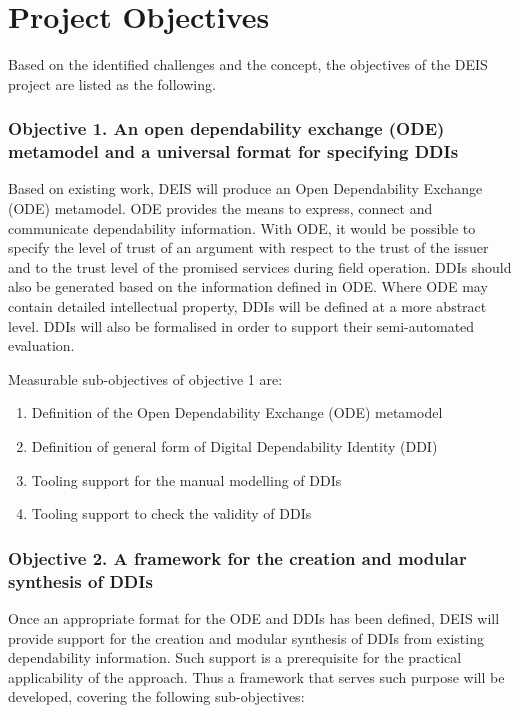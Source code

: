\section{Project Objectives}
Based on the identified challenges and the concept, the objectives of the DEIS project are listed as the following.

\subsubsection{Objective 1. An open dependability exchange (ODE) metamodel and a universal format for specifying DDIs} 
Based on existing work, DEIS will produce an Open Dependability Exchange (ODE) metamodel. ODE provides the means to express, connect and communicate dependability information.  
With ODE, it would be possible to specify the level of trust of an argument with respect to the trust of the issuer and to the trust level of the promised services during field operation. DDIs should also be generated based on the information defined in ODE. Where ODE may contain detailed intellectual property, DDIs will be defined at a more abstract level. DDIs will also be formalised in order to support their semi-automated evaluation.

Measurable sub-objectives of objective 1 are:
\begin{enumerate}
	\item Definition of the Open Dependability Exchange (ODE) metamodel
	\item Definition of general form of Digital Dependability Identity (DDI)
	\item Tooling support for the manual modelling of DDIs
	\item Tooling support to check the validity of DDIs
\end{enumerate}

\subsubsection{Objective 2. A framework for the creation and modular synthesis of DDIs}
Once an appropriate format for the ODE and DDIs has been defined, DEIS will provide support for the creation and modular synthesis of DDIs from existing dependability information. Such support is a prerequisite for the practical applicability of the approach. Thus a framework that serves such purpose will be developed, covering the following sub-objectives:

